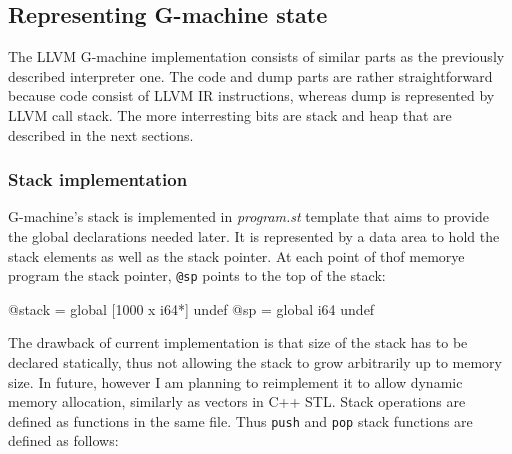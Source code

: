 \documentclass[12pt,a4paper]{report}
\begin{document}
\subsection{Representing G-machine state}
The LLVM G-machine implementation consists of similar parts as the previously
described interpreter one. The code and dump parts are rather straightforward
because code consist of LLVM IR instructions, whereas dump is represented by
LLVM call stack. The more interresting bits are stack and heap that are
described in the next sections.

\subsubsection{Stack implementation}
G-machine's stack is implemented in \textit{program.st}
template that aims to provide the global declarations needed later. It is
represented by a data area to hold the stack elements as well as the stack
pointer. At each point of thof memorye program the stack pointer, \texttt{@sp} points to
the top of the stack:

\vspace*{0.2in}
\begin{code}[style=assembler]
  @stack = global [1000 x i64*] undef
  @sp = global i64 undef
\end{code}

The drawback of current implementation is that size of the stack has to be
declared statically, thus not allowing the stack to grow arbitrarily up to
memory size. In future, however I am planning to reimplement it to allow dynamic
memory allocation, similarly as vectors in C++ STL. Stack operations are
defined as functions in the same file. Thus \texttt{push} and \texttt{pop}
stack functions are defined as follows:

\vspace*{0.2in}
\end{document}
